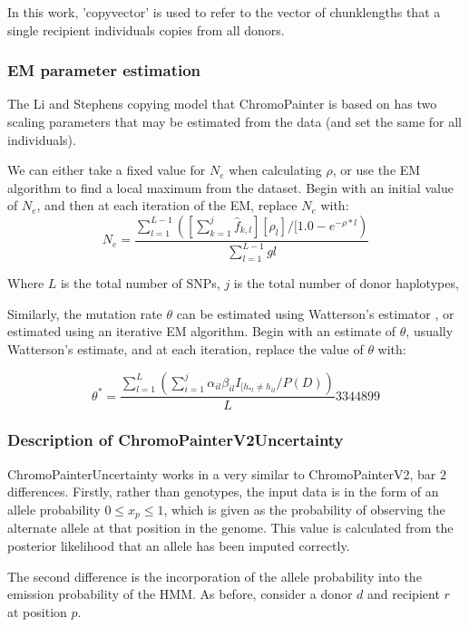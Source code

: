 In this work, 'copyvector' is used to refer to the vector of chunklengths that a single recipient individuals copies from all donors.


\subsubsection{EM parameter estimation}

The Li and Stephens copying model that ChromoPainter is based on has two scaling parameters that may be estimated from the data (and set the same for all individuals). 

We can either take a fixed value for $N_{e}$ when calculating $\rho$, or use the EM algorithm to find a local maximum from the dataset. Begin with an initial value of $N_{e}$, and then at each iteration of the EM, replace $N_{e}$ with:
\begin{equation}
N_{e} = \frac{\sum_{l=1}^{L-1}([\sum_{k=1}^{j} \hat{f}_{k,l}][\rho_{l}]/[1.0-e^{-\rho*l})}{\sum_{l=1}^{L-1} gl}
\end{equation}

Where $L$ is the total number of SNPs, $j$ is the total number of donor haplotypes, 

Similarly, the mutation rate $\theta$ can be estimated using Watterson's estimator \cite{Watterson1975}, or estimated using an iterative EM algorithm. Begin with an estimate of $\theta$, usually Watterson's estimate, and at each iteration, replace the value of $\theta$ with:

\begin{equation}
\theta^{*} = \frac{\sum_{l=1}^{L}(\sum_{i=1}^{j} \alpha_{il} \beta_{il} I_{[h_{*l} \neq h_{il}} / P(D)
)}{L}3344899
\end{equation}

\subsubsection{Description of ChromoPainterV2Uncertainty}

ChromoPainterUncertainty works in a very similar to ChromoPainterV2, bar 2 differences. Firstly, rather than genotypes, the input data is in the form of an allele probability $0 \leq x_{p} \leq 1$, which is given as the probability of observing the alternate allele at that position in the genome. This value is calculated from the posterior likelihood that an allele has been imputed correctly.  

The second difference is the incorporation of the allele probability into the emission probability of the HMM. As before, consider a donor $d$ and recipient $r$ at position $p$.

